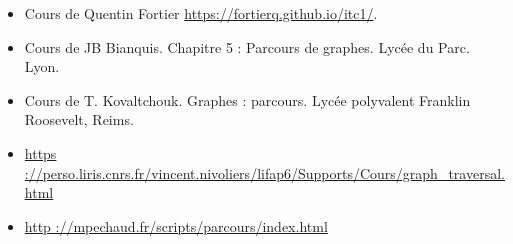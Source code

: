 \begin{itemize}
\item Cours de Quentin Fortier \url{https://fortierq.github.io/itc1/}.
\item Cours de JB Bianquis. Chapitre 5 : Parcours de graphes. Lycée du Parc. Lyon.
\item Cours de T. Kovaltchouk. Graphes : parcours. Lycée polyvalent Franklin Roosevelt, Reims.
\item \url{https ://perso.liris.cnrs.fr/vincent.nivoliers/lifap6/Supports/Cours/graph_traversal.html}
\item \url{http ://mpechaud.fr/scripts/parcours/index.html}
\end{itemize}